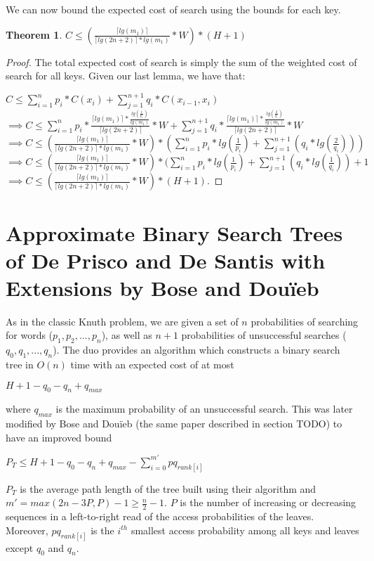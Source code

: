 \documentclass[letterpaper,12pt,titlepage,oneside,final]{book}
\theoremstyle{plain}
\newtheorem{thm}{Theorem}[section]
\begin{document}
We can now bound the expected cost of search using the bounds for each key.

\begin{thm}
$C \leq  (\frac{\lceil lg(m_1) \rceil}{\lceil lg(2n+2) \rceil*lg(m_1)} * W) * (H + 1)$
\end{thm}

\begin{proof}
The total expected cost of search is simply the sum of the weighted cost of search for all keys. Given our last lemma, we have that:

$C \leq \sum_{i=1}^{n} p_i*C(x_i) + \sum_{j=1}^{n+1} q_i*C(x_{i-1},x_i)$ \\

$\implies C \leq \sum_{i=1}^{n} p_i*\frac{\lceil lg(m_1) \rceil * \frac{lg(\frac{1}{p_i})}{lg(m_1)}}{\lceil lg(2n+2) \rceil} * W + \sum_{j=1}^{n+1} q_i*\frac{\lceil lg(m_1) \rceil * \frac{lg(\frac{2}{q_i})}{lg(m_1)}}{\lceil lg(2n+2) \rceil} * W$ \\

$\implies C \leq  (\frac{\lceil lg(m_1) \rceil}{\lceil lg(2n+2) \rceil*lg(m_1)} * W) * (\sum_{i=1}^{n} p_i*lg(\frac{1}{p_i}) + \sum_{j=1}^{n+1} (q_i*lg(\frac{2}{q_i})))$ \\

$\implies C \leq  (\frac{\lceil lg(m_1) \rceil}{\lceil lg(2n+2) \rceil*lg(m_1)} * W) * (\sum_{i=1}^{n} p_i*lg(\frac{1}{p_i}) + \sum_{j=1}^{n+1} (q_i*lg(\frac{1}{q_i}))+ 1$ \\

$\implies C \leq  (\frac{\lceil lg(m_1) \rceil}{\lceil lg(2n+2) \rceil*lg(m_1)} * W) * (H + 1)$.
\end{proof}


\section{Approximate Binary Search Trees of De Prisco and De Santis with Extensions by Bose and Dou\"{i}eb}

As in the classic Knuth problem, we are given a set of $n$ probabilities of searching for words ($p_1, p_2, ..., p_n$), as well as $n+1$ probabilities of unsuccessful searches ($q_0, q_1, ..., q_n$). The duo provides an algorithm which constructs a binary search tree in $O(n)$ time with an expected cost of at most \cite{de1993binary}
\begin{center}
$H+1-q_0-q_n+q_{max}$
\end{center}  where $q_{max}$ is the maximum probability of an unsuccessful search. This was later modified by Bose and Dou\"{i}eb (the same paper described in section TODO) to have an improved bound \cite{bose2009efficient}
\begin{center}
$P_T \leq H + 1 - q_0 - q_n + q_{max} - \sum_{i=0}^{m'} pq_{rank[i]}$
\end{center}
$P_T$ is the average path length of the tree built using their algorithm and $m'=max({2n-3P,P})-1 \geq \frac{n}{2} - 1$. $P$ is the number of increasing or decreasing sequences in a left-to-right read of the access probabilities of the leaves. Moreover, $pq_{rank[i]}$ is the $i^{th}$ smallest access probability among all keys and leaves except $q_0$ and $q_n$. \\
\end{document}
